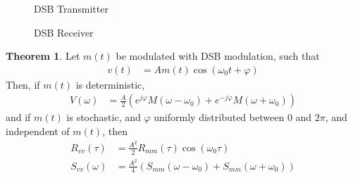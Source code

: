 \documentclass[titlepage, fleqn, a4paper, 12pt, twoside]{article}
\theoremstyle{definition}
\theoremstyle{theorem}
\newtheorem{theorem}{Theorem}
\renewcommand{\tilde}{\widetilde}
\begin{document}
\begin{figure}[H]
	\centering
	\caption{DSB Transmitter}
	\label{fig:DSB_transmitter}
\end{figure}

\begin{figure}[H]
	\centering
	\caption{DSB Receiver}
	\label{fig:DSB_receiver}
\end{figure}

\begin{theorem}
	Let $m(t)$ be modulated with DSB modulation, such that
	\begin{align*}
		v(t) &= A m(t) \cos(\omega_0 t + \varphi)
	\end{align*}
	Then, if $m(t)$ is deterministic,
	\begin{align*}
		V(\omega) &= \frac{A}{2} \left( e^{j \varphi} M(\omega - \omega_0) + e^{-j \varphi} M(\omega + \omega_0) \right)
	\end{align*}
	and if $m(t)$ is stochastic, and $\varphi$ uniformly distributed between $0$ and $2 \pi$, and independent of $m(t)$, then
	\begin{align*}
		R_{v v}(\tau) &= \frac{A^2}{2} R_{m m}(\tau) \cos(\omega_0 \tau)\\
		S_{v v}(\omega) &= \frac{A^2}{4} \left( S_{m m}(\omega - \omega_0) + S_{m m}(\omega + \omega_0) \right)
	\end{align*}
\end{theorem}
\end{document}
